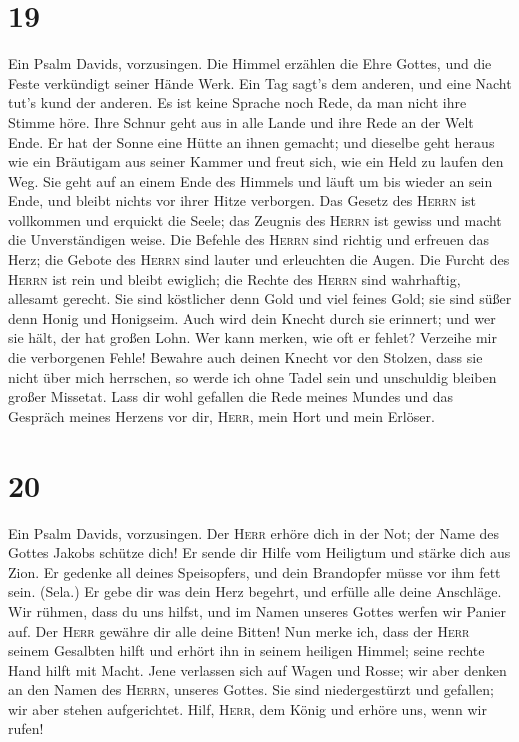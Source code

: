 \hypertarget{section-18}{%
\section{19}\label{section-18}}

 Ein Psalm Davids, vorzusingen.  Die Himmel
erzählen die Ehre Gottes, und die Feste verkündigt seiner Hände Werk.
 Ein Tag sagt's dem anderen, und eine Nacht tut's kund der
anderen.  Es ist keine Sprache noch Rede, da man nicht
ihre Stimme höre.  Ihre Schnur geht aus in alle Lande und
ihre Rede an der Welt Ende. Er hat der Sonne eine Hütte an ihnen
gemacht;  und dieselbe geht heraus wie ein Bräutigam aus
seiner Kammer und freut sich, wie ein Held zu laufen den Weg.
 Sie geht auf an einem Ende des Himmels und läuft um bis
wieder an sein Ende, und bleibt nichts vor ihrer Hitze verborgen.
 Das Gesetz des \textsc{Herrn} ist vollkommen und erquickt
die Seele; das Zeugnis des \textsc{Herrn} ist gewiss und macht die
Unverständigen weise.  Die Befehle des \textsc{Herrn} sind
richtig und erfreuen das Herz; die Gebote des \textsc{Herrn} sind lauter
und erleuchten die Augen.  Die Furcht des \textsc{Herrn}
ist rein und bleibt ewiglich; die Rechte des \textsc{Herrn} sind
wahrhaftig, allesamt gerecht.  Sie sind köstlicher denn
Gold und viel feines Gold; sie sind süßer denn Honig und Honigseim.
 Auch wird dein Knecht durch sie erinnert; und wer sie
hält, der hat großen Lohn.  Wer kann merken, wie oft er
fehlet? Verzeihe mir die verborgenen Fehle!  Bewahre auch
deinen Knecht vor den Stolzen, dass sie nicht über mich herrschen, so
werde ich ohne Tadel sein und unschuldig bleiben großer Missetat.
 Lass dir wohl gefallen die Rede meines Mundes und das
Gespräch meines Herzens vor dir, \textsc{Herr}, mein Hort und mein
Erlöser.

\hypertarget{section-19}{%
\section{20}\label{section-19}}

 Ein Psalm Davids, vorzusingen.  Der
\textsc{Herr} erhöre dich in der Not; der Name des Gottes Jakobs schütze
dich!  Er sende dir Hilfe vom Heiligtum und stärke dich
aus Zion.  Er gedenke all deines Speisopfers, und dein
Brandopfer müsse vor ihm fett sein. (Sela.)  Er gebe dir
was dein Herz begehrt, und erfülle alle deine Anschläge. 
Wir rühmen, dass du uns hilfst, und im Namen unseres Gottes werfen wir
Panier auf. Der \textsc{Herr} gewähre dir alle deine Bitten!
 Nun merke ich, dass der \textsc{Herr} seinem Gesalbten
hilft und erhört ihn in seinem heiligen Himmel; seine rechte Hand hilft
mit Macht.  Jene verlassen sich auf Wagen und Rosse; wir
aber denken an den Namen des \textsc{Herrn}, unseres Gottes.
 Sie sind niedergestürzt und gefallen; wir aber stehen
aufgerichtet.  Hilf, \textsc{Herr}, dem König und erhöre
uns, wenn wir rufen!

